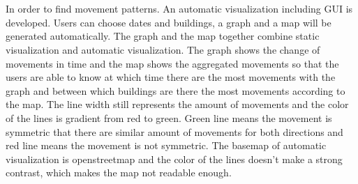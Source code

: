 \\\\
In order to find movement patterns. An automatic visualization including GUI is developed. Users can choose dates and buildings, a graph and a map will be generated automatically. The graph and the map together combine static visualization and automatic visualization. The graph shows the change of movements in time and the map shows the aggregated movements so that the users are able to know at which time there are the most movements with the graph and between which buildings are there the most movements according to the map. The line width still represents the amount of movements and the color of the lines is gradient from red to green. Green line means the movement is symmetric that there are similar amount of movements for both directions and red line means the movement is not symmetric. The basemap of automatic visualization is openstreetmap and the color of the lines doesn't make a strong contrast, which makes the map not readable enough.
